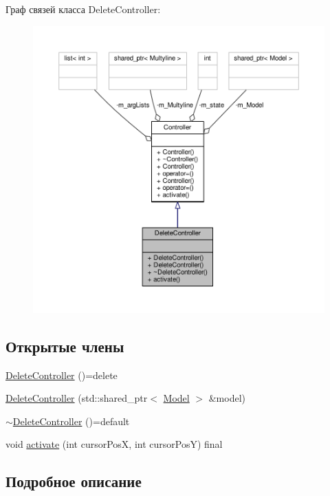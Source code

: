 Граф связей класса Delete\-Controller\-:
\nopagebreak
\begin{figure}[H]
\begin{center}
\leavevmode
\includegraphics[width=350pt]{class_delete_controller__coll__graph}
\end{center}
\end{figure}
\subsection*{Открытые члены}
\begin{DoxyCompactItemize}
\item 
\hyperlink{class_delete_controller_acaa7ec19df8914bad38a2119e0a69ba9}{Delete\-Controller} ()=delete
\item 
\hyperlink{class_delete_controller_ae51255a8c23649c9bcd024a43a254129}{Delete\-Controller} (std\-::shared\-\_\-ptr$<$ \hyperlink{class_model}{Model} $>$ \&model)
\item 
\hyperlink{class_delete_controller_a1ea8fdb189618aa6c305a27e48f059f9}{$\sim$\-Delete\-Controller} ()=default
\item 
void \hyperlink{class_delete_controller_a77305d1d2c625ff61b61f97a8beffd03}{activate} (int cursor\-Pos\-X, int cursor\-Pos\-Y) final
\end{DoxyCompactItemize}


\subsection{Подробное описание}


